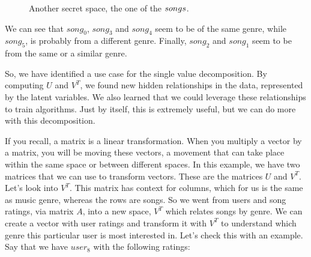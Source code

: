 \documentclass[600paper, 11pt,twoside,openany]{kdp}
\begin{document}
\begin{figure}[h!]
\begin{center}
\end{center}
\caption{Another secret space, the one of the $\protect songs$.}
\end{figure}
\newpage
We can see that $song_0$, $song_3$ and $song_4$ seem to be of the same genre, while $song_5$, is probably from a different genre. Finally, $song_2$ and $song_1$ seem to be from the same or a similar genre.
\par 
\vspace{-3pt}
\indent So, we have identified a use case for the single value decomposition. By computing $U$ and $V^T$, we found new hidden relationships in the data, represented by the latent variables. We also learned that we could leverage these relationships to train algorithms. Just by itself, this is extremely useful, but we can do more with this decomposition.
\par 
\vspace{-3pt}
\indent If you recall, a matrix is a linear transformation. When you multiply a vector by a matrix, you will be moving these vectors, a movement that can take place within the same space or between different spaces. In this example, we have two matrices that we can use to transform vectors. These are the matrices $U$ and $V^T$. Let’s look into $V^T$. This matrix has context for columns, which for us is the same as music genre, whereas the rows are songs. So we went from users and song ratings, via matrix $A$, into a new space, $V^T$ which relates songs by genre. We can create a vector with user ratings and transform it with $V^T$ to understand which genre this particular user is most interested in. Let’s check this with an example. Say that we have $user_8$ with the following ratings:
\end{document}
